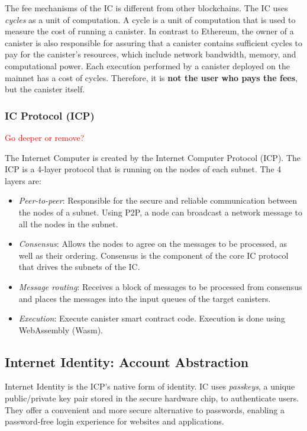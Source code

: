 The fee mechanisms of the IC is different from other blockchains. The IC uses \textit{cycles} as a unit of computation. A cycle is a unit of computation that is used to measure the cost of running a canister. In contrast to Ethereum, the owner of a canister is also responsible for assuring that a canister contains sufficient cycles to pay for the canister's resources, which include network bandwidth, memory, and computational power. Each execution performed by a canister deployed on the mainnet has a cost of cycles. Therefore, it is \textbf{not the user who pays the fees}, but the canister itself. \cite{icp-developer-journey}

\subsubsection{IC Protocol (ICP)}

\textcolor{red}{Go deeper or remove?}

The Internet Computer is created by the Internet Computer Protocol (ICP). The ICP is a 4-layer protocol that is running on the nodes of each subnet. The 4 layers are: \cite{icp-how-it-works}

\begin{itemize}
    \item \textit{Peer-to-peer}: Responsible for the secure and reliable communication between the nodes of a subnet. Using P2P, a node can broadcast a network message to all the nodes in the subnet.
    \item \textit{Consensus}: Allows the nodes to agree on the messages to be processed, as well as their ordering. Consensus is the component of the core IC protocol that drives the subnets of the IC.
    \item \textit{Message routing}: Receives a block of messages to be processed from consensus and places the messages into the input queues of the target canisters.
    \item \textit{Execution}: Execute canister smart contract code. Execution is done using WebAssembly (Wasm). 
\end{itemize}


\subsection{Internet Identity: Account Abstraction}

Internet Identity is the ICP's native form of identity. IC uses \textit{passkeys}, a unique public/private key pair stored in the secure hardware chip, to authenticate users. They offer a convenient and more secure alternative to passwords, enabling a password-free login experience for websites and applications. \cite{icp-identity}

